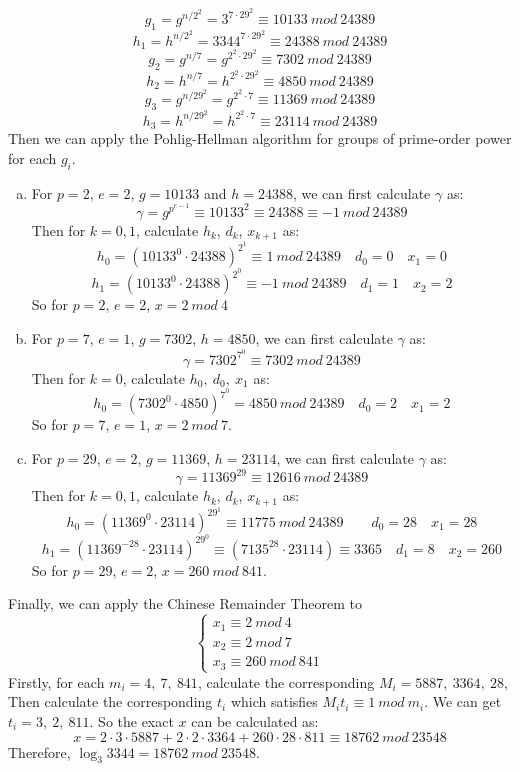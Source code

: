 \documentclass[12pt, a4paper]{article}
\begin{document}
$$g_1 = g^{n/2^2} = 3^{7\cdot 29^2} \equiv 10133\ mod\ 24389$$
$$h_1 = h^{n/2^2} = 3344^{7\cdot 29^2} \equiv 24388\ mod\ 24389$$
$$g_2 = g^{n/7} = g^{2^2\cdot 29^2} \equiv 7302\ mod\ 24389$$
$$h_2 = h^{n/7} = h^{2^2\cdot 29^2} \equiv 4850\ mod\ 24389$$
$$g_3 = g^{n/29^2} = g^{2^2\cdot 7} \equiv 11369\ mod\ 24389$$
$$h_3 = h^{n/29^2} = h^{2^2\cdot 7} \equiv 23114\ mod\ 24389$$
Then we can apply the Pohlig-Hellman algorithm for groups of prime-order power for each $g_i$.
\begin{enumerate}[(a)]
    \item For $p = 2$, $e = 2$, $g = 10133$ and $h = 24388$, we can first calculate $\gamma$ as:
          $$\gamma = g^{p^{e-1}} \equiv 10133^{2} \equiv 24388 \equiv -1\ mod\ 24389$$
          Then for $k = 0, 1$, calculate $h_k$, $d_k$, $x_{k+1}$ as:
          $$h_0 = (10133^0\cdot 24388)^{2^1} \equiv 1\ mod\ 24389\quad d_0 = 0 \quad x_1 = 0$$
          $$h_1 = (10133^0\cdot 24388)^{2^0} \equiv -1\ mod\ 24389\quad d_1 = 1\quad x_2 = 2$$
          So for $p = 2$, $e = 2$, $x = 2\ mod\ 4$
    \item For $p = 7$, $e = 1$, $g = 7302$, $h = 4850$, we can first calculate $\gamma$ as:
          $$\gamma = 7302^{7^0} \equiv 7302\ mod\ 24389$$
          Then for $k = 0$, calculate $h_0,\ d_0,\ x_{1}$ as:
          $$h_0 = (7302^0\cdot 4850)^{7^0} = 4850\ mod\ 24389\quad d_0 = 2\quad x_1 = 2$$
          So for $p = 7$, $e = 1$, $x = 2\ mod\ 7$.
    \item For $p = 29$, $e = 2$, $g = 11369$, $h = 23114$, we can first calculate $\gamma$ as:
          $$\gamma = 11369^{29} \equiv 12616\ mod\ 24389$$
          Then for $k = 0, 1$, calculate $h_k$, $d_k$, $x_{k+1}$ as:
          $$h_0 = (11369^0\cdot 23114)^{29^1} \equiv 11775\ mod\ 24389\qquad d_0 = 28\quad x_1 = 28$$
          $$h_1 = (11369^{-28}\cdot 23114)^{29^0} \equiv (7135^{28}\cdot 23114) \equiv 3365\quad
          d_1 = 8\quad x_2 = 260$$
          So for $p = 29$, $e = 2$, $x = 260\ mod\ 841$.
\end{enumerate}
Finally, we can apply the Chinese Remainder Theorem to
\begin{equation*}
    \begin{cases}
        x_1 \equiv 2\ mod\ 4\\
        x_2 \equiv 2\ mod\ 7\\
        x_3 \equiv 260\ mod\ 841
    \end{cases}
\end{equation*}
Firstly, for each $m_i = 4,\ 7,\ 841$, calculate the corresponding $M_i = 5887,\ 3364,\ 28$, 
Then calculate the corresponding $t_i$ which satisfies $M_it_i \equiv 1\ mod\ m_i$. 
We can get $t_i = 3,\ 2,\ 811$. So the exact $x$ can be calculated as:
$$x = 2\cdot 3\cdot 5887 + 2\cdot 2\cdot 3364 + 260\cdot 28\cdot 811 \equiv 18762\ mod\ 23548$$
Therefore, $\log_3 3344 = 18762\ mod\ 23548$.
\end{document}
